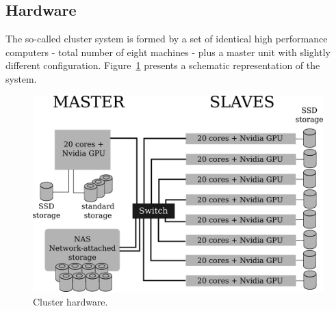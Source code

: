 \documentclass[twoside,a4paper,12pt,english]{inac17}
\begin{document}



\subsection{Hardware}

The so-called cluster system is formed by a set of identical high performance computers -
total number of eight machines - plus a master unit with slightly different configuration.
Figure~\ref{fig:cluster} presents a schematic representation of the system.

\begin{figure}[h] %
  \centering\includegraphics[scale=0.7]{images/cluster-topologico.png}
  \caption{Cluster hardware.}
  \label{fig:cluster}
\end{figure}
\end{document}
